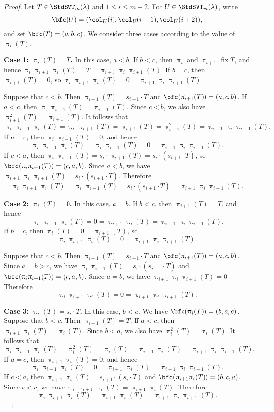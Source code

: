 \documentclass[12pt, reqno]{amsart}
\numberwithin{equation}{section}
\numberwithin{figure}{section}
\numberwithin{table}{section}
\theoremstyle{definition}
\begin{document}
\begin{proof}
Let $T\in\StdSVT_m(\lambda)$ and $1\le i\le m-2$.
For $U\in\StdSVT_m(\lambda)$, write
\[
\bfc(U)=(\col_U(i),\col_U(i+1),\col_U(i+2)),
\]
and set $\bfc(T)=(a,b,c)$.
We consider three cases according to the value of $\uppi_i(T)$.

\medskip
\noindent
{\bf Case 1: $\uppi_i(T)=T$.}
In this case, $a<b$.
If $b<c$, then $\uppi_i$ and $\uppi_{i+1}$ fix $T$, and hence $\uppi_i\uppi_{i+1}\uppi_i(T) = T = \uppi_{i+1}\uppi_i\uppi_{i+1}(T)$.
If $b=c$, then $\uppi_{i+1}(T)=0$, so $\uppi_i\uppi_{i+1}\uppi_i(T) = 0 = \uppi_{i+1}\uppi_i\uppi_{i+1}(T)$.

Suppose that $c < b$.
Then $\uppi_{i+1}(T) = s_{i+1} \cdot T$ and $\bfc(\uppi_{i+1}(T))=(a,c,b)$.
If $a<c$, then $\uppi_i\uppi_{i+1}(T)=\uppi_{i+1}(T)$.
Since $c<b$, we also have $\uppi_{i+1}^2(T)=\uppi_{i+1}(T)$.
It follows that
\[
\uppi_i\uppi_{i+1}\uppi_i(T) = \uppi_i\uppi_{i+1}(T) = \uppi_{i+1}(T) = \uppi_{i+1}^2(T) = \uppi_{i+1}\uppi_i\uppi_{i+1}(T).
\]
If $a=c$, then $\uppi_i\uppi_{i+1}(T) = 0$, and hence
\[
\uppi_i\uppi_{i+1}\uppi_i(T) = \uppi_i\uppi_{i+1}(T) = 0 = \uppi_{i+1}\uppi_i\uppi_{i+1}(T).
\]
If $c < a$, then $\uppi_i\uppi_{i+1}(T) = s_i \cdot \uppi_{i+1}(T) = s_i \cdot (s_{i+1} \cdot T)$, so $\bfc(\uppi_i \uppi_{i+1}(T)) = (c,a,b)$.
Since $a<b$, we have $\uppi_{i+1} \uppi_i\uppi_{i+1}(T) = s_i \cdot (s_{i+1} \cdot T)$.
Therefore
\[
\uppi_i\uppi_{i+1}\uppi_i(T) = \uppi_i\uppi_{i+1}(T) = s_i \cdot (s_{i+1} \cdot T) = \uppi_{i+1}\uppi_i\uppi_{i+1}(T).
\]


\medskip
\noindent
{\bf Case 2: $\uppi_i(T)=0$.}
In this case, $a=b$.
If $b<c$, then $\uppi_{i+1}(T)=T$, and hence
\[
\uppi_i\uppi_{i+1}\uppi_i(T) = 0 = \uppi_{i+1}\uppi_i(T) = \uppi_{i+1}\uppi_i\uppi_{i+1}(T).
\]
If $b=c$, then $\uppi_i(T)=0=\uppi_{i+1}(T)$, so
\[
\uppi_i\uppi_{i+1}\uppi_i(T) = 0 = \uppi_{i+1}\uppi_i\uppi_{i+1}(T).
\]

Suppose that $c<b$.
Then $\uppi_{i+1}(T)=s_{i+1} \cdot T$ and $\bfc(\uppi_{i+1}(T))=(a,c,b)$.
Since $a=b>c$, we have $\uppi_i\uppi_{i+1}(T)=s_i \cdot (s_{i+1} \cdot T)$ and $\bfc(\uppi_i\uppi_{i+1}(T))=(c,a,b)$.
Since $a=b$, we have $\uppi_{i+1}\uppi_i\uppi_{i+1}(T)=0$.
Therefore
\[
\uppi_i\uppi_{i+1}\uppi_i(T) = 0 = \uppi_{i+1}\uppi_i\uppi_{i+1}(T).
\]

\medskip
\noindent
{\bf Case 3: $\uppi_i(T)=s_i\cdot T$.}
In this case, $b<a$.
We have $\bfc(\uppi_i(T))=(b,a,c)$.
Suppose that $b<c$.
Then $\uppi_{i+1}(T)=T$.
If $a<c$, then $\uppi_{i+1}\uppi_i(T)=\uppi_i(T)$.
Since $b<a$, we also have $\uppi_i^2(T)=\uppi_i(T)$.
It follows that
\[
\uppi_i\uppi_{i+1}\uppi_i(T) = \uppi_i^2(T) = \uppi_i(T) = \uppi_{i+1}\uppi_i(T) = \uppi_{i+1}\uppi_i\uppi_{i+1}(T).
\]
If $a=c$, then $\uppi_{i+1}\uppi_i(T)=0$, and hence
\[
\uppi_i\uppi_{i+1}\uppi_i(T) = 0 = \uppi_{i+1}\uppi_i(T) = \uppi_{i+1}\uppi_i\uppi_{i+1}(T).
\]
If $c<a$, then $\uppi_{i+1}\uppi_i(T)=s_{i+1} \cdot (s_i \cdot T)$ and $\bfc(\uppi_{i+1}\uppi_i(T))=(b,c,a)$.
Since $b<c$, we have $\uppi_i\uppi_{i+1}\uppi_i(T)=\uppi_{i+1} \uppi_i (T)$.
Therefore
\[
\uppi_i\uppi_{i+1}\uppi_i(T) = \uppi_{i+1}\uppi_i(T) = \uppi_{i+1}\uppi_i\uppi_{i+1}(T).
\]


\end{proof}
\end{document}
